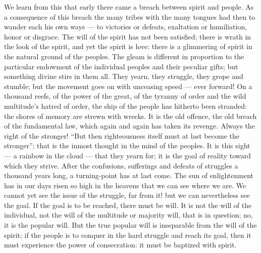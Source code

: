 \documentclass[12pt,a4paper,openany]{book}
\newcommand{\opage}[1]{\marginnote{\footnotesize\textit{[#1]}}}
\begin{document}
We learn from this that early there came a breach
between spirit and people. As a consequence of this breach
the many tribes with the many tongues
\setcounter{footnote}{0}%
\opage{17}had then to wander each his own ways --- to victories or defeats, exaltation
or humiliation, honor or disgrace. The will of the spirit
has not been satisfied; there is wrath in the look
of the spirit, and yet the spirit is love: there is a glimmering of
spirit in the natural ground of the peoples. The gleam is different
in proportion to the particular endowment of the individual peoples
and their peculiar gifts; but something
divine stirs in them all. They yearn, they struggle, they
grope and stumble; but the movement goes on with unceasing
speed --- ever forward! On a thousand reefs,
of the power of the great, of the tyranny of order and the wild
multitude's hatred of order, the ship of the people has hitherto been stranded:
the shores of memory are strewn with wrecks. It
is the old offence, the old breach of the fundamental law, which
again and again has taken its revenge. Always the right of the stronger!
``But then righteousness itself must at last
become the stronger''; that is the inmost thought
in the mind of the peoples. It is this sight --- a rainbow
in the cloud --- that they yearn for; it is the goal of reality
toward which they strive. After the confusions, sufferings and defeats
of struggles a thousand years long, a turning-point has at last
come. The sun of enlightenment has in our
days risen so high in the heavens that we can see
where we are. We cannot yet see the issue of the struggle,
far from it! but we can nevertheless see the goal. If
the goal is to be reached, there must be will. It is not the will of the individual,
not the will of the multitude or majority will,
that is in question; no, it is the popular will. But the
true popular will is inseparable from the will of the spirit; if
the people is to conquer in the hard struggle and reach its goal, then
it must experience the power of consecration: it must be baptized with
spirit.
\end{document}
